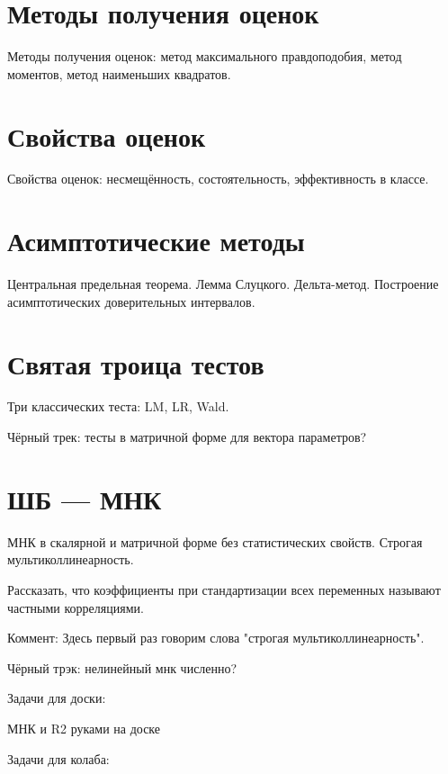 \documentclass[12pt]{article}
\begin{document}

\tableofcontents{}



\section{Методы получения оценок}

Методы получения оценок: метод максимального правдоподобия, метод моментов, метод наименьших квадратов.


\section{Свойства оценок}
Свойства оценок: несмещённость, состоятельность, эффективность в классе.


\section{Асимптотические методы}
Центральная предельная теорема. Лемма Слуцкого. Дельта-метод. Построение асимптотических доверительных интервалов.


\section{Святая троица тестов}
Три классических теста: LM, LR, Wald.


Чёрный трек: тесты в матричной форме для вектора параметров?

\section{ШБ — МНК}
МНК в скалярной и матричной форме без статистических свойств. Строгая мультиколлинеарность. 


Рассказать, что коэффициенты при стандартизации всех переменных называют частными корреляциями. 

Коммент: Здесь первый раз говорим слова "строгая мультиколлинеарность".

Чёрный трэк: нелинейный мнк численно?

Задачи для доски:

МНК и R2 руками на доске

Задачи для колаба:
\end{document}
